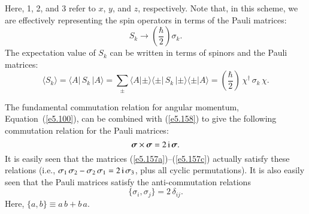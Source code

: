 Here, 1, 2, and 3 refer to $x$, $y$, and $z$, respectively. Note that, in this
scheme, we are effectively representing the spin operators in terms
of the Pauli matrices:
\begin{equation}\label{e5.158}
S_k \rightarrow \left(\frac{\hbar}{2} \right)\sigma_k.
\end{equation}
The expectation value of $S_k$ can be written in terms of spinors
and the Pauli matrices:
\begin{equation}\label{e5.159}
\langle S_k \rangle = \langle A|\,S_k \,|A\rangle = \sum_\pm
\langle A|\pm \rangle \langle \pm |\,S_k\,|\pm \rangle \langle \pm |A\rangle
= \left(\frac{\hbar}{2}\right) \,\chi^{\dag}\, \sigma_k\, \chi.
\end{equation}

The fundamental commutation relation for angular momentum, Equation~(\ref{e5.100}), can
be combined with (\ref{e5.158}) to give the following commutation relation
for the Pauli matrices:
\begin{equation}\label{e5.160}
\mbox{\boldmath$\sigma$}\times \mbox{\boldmath$\sigma$} = 2\,{\rm i}\,\mbox{\boldmath$\sigma$}.
\end{equation}
It is easily seen that the matrices (\ref{e5.157a})--(\ref{e5.157c}) actually satisfy these relations
({\rm i.e.},  $\sigma_1\, \sigma_2 - \sigma_2\,\sigma_1 = 2\,{\rm i} \,\sigma_3$, plus
all cyclic permutations). It is also easily seen that the Pauli matrices
satisfy the anti-commutation relations
\begin{equation}\label{e5.161}
\{ \sigma_i, \sigma_j \} = 2 \,\delta_{ij}.
\end{equation}
Here, $\{a,b\}\equiv a\,b+b\,a$. 

